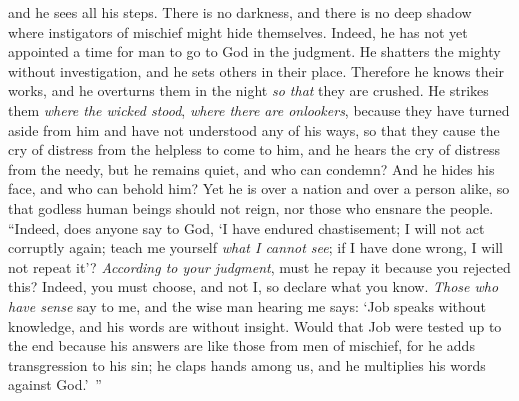 \begin{biblechapter}
and he sees all his steps.
\verse There is no darkness, and there is no deep shadow 
where instigators of mischief might hide themselves.
\verse Indeed, he has not yet appointed a time for man 
to go to God in the judgment.
\verse He shatters the mighty without investigation, 
and he sets others in their place.
\verse Therefore he knows their works, 
and he overturns them in the night 
\textit{so that} they are crushed.
\verse He strikes them \textit{where the wicked stood}, 
\textit{where there are onlookers},
\verse because they have turned aside from him 
and have not understood any of his ways,
\verse so that they cause the cry of distress from the helpless to come to him, 
and he hears the cry of distress from the needy,
\verse but he remains quiet, and who can condemn? 
And he hides his face, and who can behold him? 
Yet he is over a nation and over a person alike,
\verse so that godless human beings should not reign, 
nor those who ensnare the people.
\verse “Indeed, does anyone say to God, ‘I have endured chastisement; 
I will not act corruptly again;
\verse teach me yourself \textit{what I cannot see}; 
if I have done wrong, I will not repeat it’?
\verse \textit{According to your judgment}, must he repay it because you rejected this? 
Indeed, you must choose, and not I, so declare what you know.
\verse \textit{Those who have sense} say to me, 
and the wise man hearing me says:
\verse ‘Job speaks without knowledge, 
and his words are without insight.
\verse Would that Job were tested up to the end 
because his answers are like those from men of mischief,
\verse for he adds transgression to his sin; 
he claps hands among us, 
and he multiplies his words against God.’ ”
\end{biblechapter}

